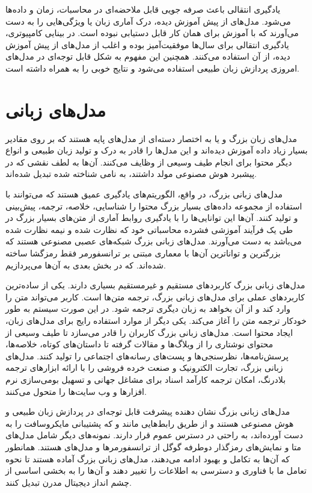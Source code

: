 یادگیری انتقالی باعث صرفه جویی قابل ملاحضه‌ای در محاسبات، زمان و داده‌ها می‌شود. مدل‌های از پیش آموزش دیده، درک آماری زبان یا ویژگی‌هایی را به دست می‌آورند که با آموزش برای همان کار قابل دستیابی نبوده است.
در بینایی کامپیوتری، یادگیری انتقالی برای سال‌ها موفقیت‌آمیز بوده و اغلب از مدل‌های از پیش آموزش دیده، از آن استفاده می‌کنند. همچنین این مفهوم به شکل قابل توجه‌ای در مدل‌های امروزی پردازش زبان طبیعی استفاده می‌شود و نتایج خوبی را به همراه داشته است.\cite{pan2009survey}\cite{transfer-learning}\cite{raffel2019exploring}


\section{مدل‌های زبانی}
\hspace{30pt}
مدل‌های زبان بزرگ و یا به اختصار  دسته‌ای از مدل‌های پایه هستند که بر روی مقادیر بسیار زیاد داده آموزش دیده‌اند و این مدل‌ها را قادر به درک و تولید زبان طبیعی و انواع دیگر محتوا برای انجام طیف وسیعی از وظایف می‌کنند. آن‌ها به لطف نقشی که در پیشبرد هوش مصنوعی مولد داشتند، به نامی شناخته شده تبدیل شده‌اند.

مدل‌های زبانی بزرگ، در واقع، الگوریتم‌های یادگیری عمیق هستند که می‌توانند با استفاده از مجموعه داده‌های بسیار بزرگ محتوا را شناسایی، خلاصه، ترجمه، پیش‌بینی و تولید کنند. آن‌ها این توانایی‌ها را با یادگیری روابط آماری از متن‌های بسیار بزرگ در طی یک فرآیند آموزشی فشرده محاسباتی خود که نظارت شده و نیمه نظارت شده می‌باشد به دست می‌آورند. مدل‌های زبانی بزرگ شبکه‌های عصبی مصنوعی هستند که بزرگترین و تواناترین آن‌ها با معماری مبتنی بر ترانسفورمر فقط رمزگشا ساخته شده‌اند. که در بخش بعدی به آن‌ها می‌پردازیم.

مدل‌های زبانی بزرگ کاربرد‌های مستقیم و غیر‌مستقیم بسیاری دارند. یکی از ساده‌ترین کاربردهای عملی برای مدل‌های زبانی بزرگ، ترجمه متن‌ها است. کاربر می‌تواند متن را وارد کند و از آن بخواهد به زبان دیگری ترجمه شود. در این صورت سیستم به طور خودکار ترجمه متن را آغاز می‌کند. یکی دیگر از موارد استفاده رایج برای مدل‌های زبان، ایجاد محتوا است. مدل‌های زبانی بزرگ کاربران را قادر می‌سازد تا طیف وسیعی از محتوای نوشتاری را از وبلاگ‌ها و مقالات گرفته تا داستان‌های کوتاه، خلاصه‌ها، پرسش‌نامه‌ها، نظرسنجی‌ها و پست‌های رسانه‌های اجتماعی را تولید کنند.
مدل‌های زبانی بزرگ، تجارت الکترونیک و صنعت خرده فروشی را با ارائه ابزارهای ترجمه بلادرنگ، امکان ترجمه کارآمد اسناد برای مشاغل جهانی و تسهیل بومی‌سازی نرم افزارها و وب سایت‌ها را متحول می‌کنند. \cite{brown2020language}

مدل‌های زبانی بزرگ نشان دهنده پیشرفت قابل توجه‌ای در پردازش زبان طبیعی و هوش مصنوعی هستند و از طریق رابط‌هایی مانند  و  \cite{openai2023chatgpt} که پشتیبانی مایکروسافت را به دست آورده‌اند، به راحتی در دسترس عموم قرار دارند. نمونه‌های دیگر شامل مدل‌های \cite{touvron2023llama} متا و نمایش‌های رمزگذار دوطرفه گوگل از ترانسفورمرها \cite{devlin2018bert}\cite{liu2019roberta} و مدل‌های \cite{palm1} هستند. همانطور که آن‌ها به تکامل و بهبود ادامه‌ می‌دهند، مدل‌های زبانی بزرگ آماده هستند تا نحوه تعامل ما با فناوری و دسترسی به اطلاعات را تغییر دهند و آن‌ها را به بخشی اساسی از چشم انداز دیجیتال مدرن تبدیل کنند.

